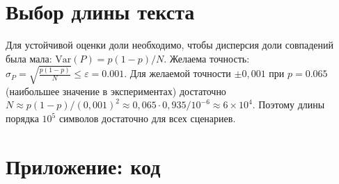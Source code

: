 \documentclass[a4paper,12pt]{article}
\begin{document}
\section{Выбор длины текста}
Для устойчивой оценки доли необходимо, чтобы дисперсия доли совпадений была мала: $\mathrm{Var}(P)=p(1-p)/N$. 
Желаема точность: $\sigma_P = \sqrt{\frac{p(1-p)}{N}} \le \varepsilon = 0.001$. Для желаемой точности $\pm0{,}001$ при $p=0.065$ (наибольшее значение в экспериментах) достаточно $N\approx p(1-p)/(0{,}001)^2\approx0{,}065\cdot0{,}935/10^{-6}\approx6\times10^4$. Поэтому длины порядка $10^5$ символов достаточно для всех сценариев.

\section{Приложение: код}
\end{document}
